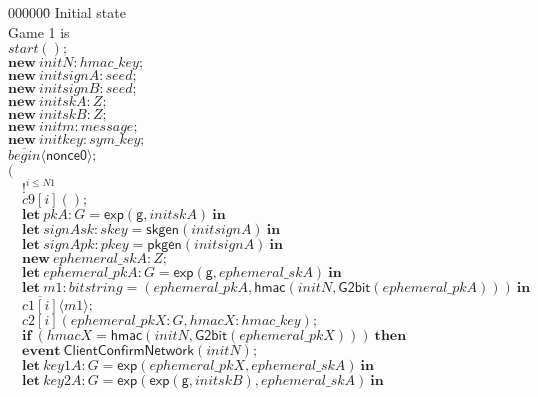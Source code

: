 \documentclass{article}
\newcommand{\cinput}[2]{{#1}({#2})}
\newcommand{\coutput}[2]{\overline{#1}\langle{#2}\rangle}
\newcommand{\kw}[1]{\mathbf{#1}}
\newcommand{\kwf}[1]{\mathsf{#1}}
\newcommand{\var}[1]{\mathit{#1}}
\newcommand{\kwt}[1]{\mathit{#1}}
\newcommand{\kwp}[1]{\mathit{#1}}
\newcommand{\kwc}[1]{\mathit{#1}}
\begin{document}
\begin{tabbing}
000000\=\kill
Initial state\\
Game 1 is\\
\>$\cinput{\kwc{start}}{};$\\
\>$\kw{new}\ \var{initN}: \kwt{hmac{\_}key};$\\
\>$\kw{new}\ \var{initsignA}: \kwt{seed};$\\
\>$\kw{new}\ \var{initsignB}: \kwt{seed};$\\
\>$\kw{new}\ \var{initskA}: \kwt{Z};$\\
\>$\kw{new}\ \var{initskB}: \kwt{Z};$\\
\>$\kw{new}\ \var{initm}: \kwt{message};$\\
\>$\kw{new}\ \var{initkey}: \kwt{sym{\_}key};$\\
\>$\coutput{\kwc{begin}}{\kwf{nonce0}};$\\
\>$($\\
\>$\quad !^{\var{i} \leq \kwp{N1}}$\\
\>$\quad \cinput{\kwc{c9}[\var{i}]}{};$\\
\>$\quad \kw{let}\ \var{pkA}: \kwt{G} = \kwf{exp}(\kwf{g}, \var{initskA})\ \kw{in}$\\
\>$\quad \kw{let}\ \var{signAsk}: \kwt{skey} = \kwf{skgen}(\var{initsignA})\ \kw{in}$\\
\>$\quad \kw{let}\ \var{signApk}: \kwt{pkey} = \kwf{pkgen}(\var{initsignA})\ \kw{in}$\\
\>$\quad \kw{new}\ \var{ephemeral{\_}skA}: \kwt{Z};$\\
\>$\quad \kw{let}\ \var{ephemeral{\_}pkA}: \kwt{G} = \kwf{exp}(\kwf{g}, \var{ephemeral{\_}skA})\ \kw{in}$\\
\>$\quad \kw{let}\ \var{m1}: \kwt{bitstring} = \kwf{}(\var{ephemeral{\_}pkA}, \kwf{hmac}(\var{initN}, \kwf{G2bit}(\var{ephemeral{\_}pkA})))\ \kw{in}$\\
\>$\quad \coutput{\kwc{c1}[\var{i}]}{\var{m1}};$\\
\>$\quad \cinput{\kwc{c2}[\var{i}]}{\var{ephemeral{\_}pkX}: \kwt{G}, \var{hmacX}: \kwt{hmac{\_}key}};$\\
\>$\quad \kw{if}\ (\var{hmacX}  =  \kwf{hmac}(\var{initN}, \kwf{G2bit}(\var{ephemeral{\_}pkX})))\ \kw{then}$\\
\>$\quad \kw{event}\ \kwf{ClientConfirmNetwork}(\var{initN});$\\
\>$\quad \kw{let}\ \var{key1A}: \kwt{G} = \kwf{exp}(\var{ephemeral{\_}pkX}, \var{ephemeral{\_}skA})\ \kw{in}$\\
\>$\quad \kw{let}\ \var{key2A}: \kwt{G} = \kwf{exp}(\kwf{exp}(\kwf{g}, \var{initskB}), \var{ephemeral{\_}skA})\ \kw{in}$\\

\end{tabbing}
\end{document}
